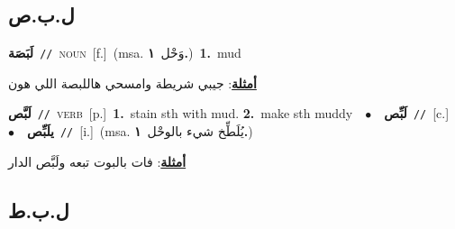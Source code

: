 \documentclass[10pt,a4paper,twoside]{article} %
\begin{document}
\begin{multicols}{2}
\vspace{-3mm}
\subsection*{\color{blue}\foreignlanguage{arabic}{ل.ب.ص}\color{blue}{}} 

{\setlength\topsep{0pt}\textbf{\foreignlanguage{arabic}{لَبَصَة}}\ {\color{gray}\texttt{//}\color{black}}\ \textsc{noun}\ [f.]\ \color{gray}(msa. \foreignlanguage{arabic}{وَحْل}~\foreignlanguage{arabic}{\textbf{١.}})\color{black}\ \textbf{1.}~mud\  \begin{flushright}\color{gray}\foreignlanguage{arabic}{\textbf{\underline{\foreignlanguage{arabic}{أمثلة}}}: جيبي شريطة وامسحي هاللبصة اللي هون}\end{flushright}\color{black}} \vspace{2mm}

{\setlength\topsep{0pt}\textbf{\foreignlanguage{arabic}{لَبَّص}}\ {\color{gray}\texttt{//}\color{black}}\ \textsc{verb}\ [p.]\ \textbf{1.}~stain sth with mud.  \textbf{2.}~make sth muddy\ \ $\bullet$\ \ \setlength\topsep{0pt}\textbf{\foreignlanguage{arabic}{لَبِّص}}\ {\color{gray}\texttt{//}\color{black}}\ [c.]\ \ $\bullet$\ \ \setlength\topsep{0pt}\textbf{\foreignlanguage{arabic}{يلَبِّص}}\ {\color{gray}\texttt{//}\color{black}}\ [i.]\ \color{gray}(msa. \foreignlanguage{arabic}{يُلَطِّخ شيء بالوحْل}~\foreignlanguage{arabic}{\textbf{١.}})\color{black}\  \begin{flushright}\color{gray}\foreignlanguage{arabic}{\textbf{\underline{\foreignlanguage{arabic}{أمثلة}}}: فات بالبوت تبعه ولَبَّص الدار}\end{flushright}\color{black}} \vspace{2mm}

\vspace{-3mm}
\subsection*{\color{blue}\foreignlanguage{arabic}{ل.ب.ط}\color{blue}{}} 


\end{multicols}
\end{document}
